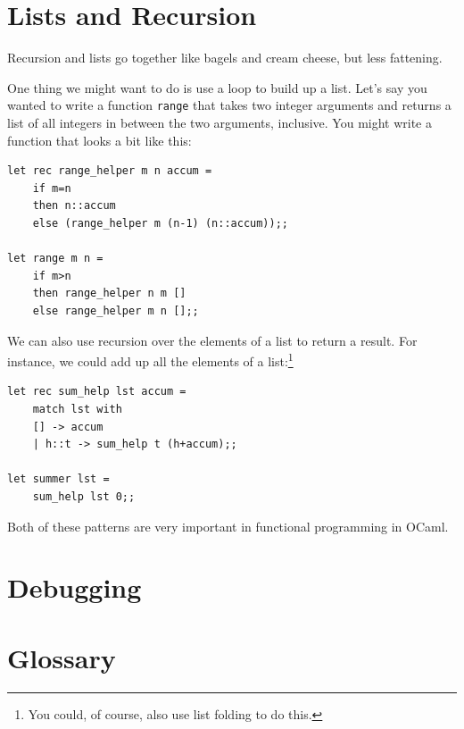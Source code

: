 \documentclass[10pt]{book}
\begin{document}
\section{Lists and Recursion}

Recursion and lists go together like bagels and cream cheese, 
but less fattening.

One thing we might want to do is use a loop to build up a list. 
Let's say you wanted to write a function {\tt range} 
that takes two integer arguments and returns a list of all integers
in between the two arguments, inclusive. You might write a function 
that looks a bit like this:

\beforeverb
\begin{verbatim}
let rec range_helper m n accum = 
	if m=n
	then n::accum
	else (range_helper m (n-1) (n::accum));;

let range m n = 
	if m>n 
	then range_helper n m []
	else range_helper m n [];;
\end{verbatim}
\afterverb

We can also use recursion over the elements of a list 
to return a result. For instance, we could add up all 
the elements of a list:\footnote{You could, of course, 
also use list folding to do this.}

\beforeverb
\begin{verbatim}
let rec sum_help lst accum = 
	match lst with
	[] -> accum
	| h::t -> sum_help t (h+accum);;

let summer lst = 
	sum_help lst 0;;
\end{verbatim}
\afterverb

Both of these patterns are very important in functional 
programming in OCaml.

\section{Debugging}

% 
% 
% 
% 


\section{Glossary}
\end{document}
